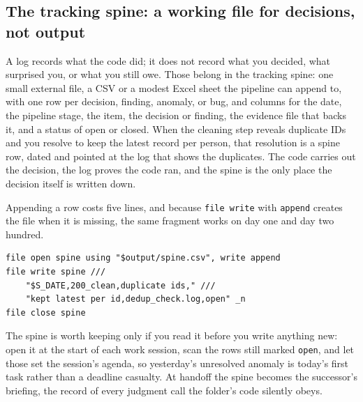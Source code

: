 \documentclass[
    a4paper,
    fontsize=10pt,
    twoside=true,
    numbers=noenddot,
]{kaobook}
\begin{document}
\subsection{The tracking spine: a working file for decisions, not output}\label{sec:ch02-spine}
A log records what the code did; it does not record what you decided, what surprised you, or what you still owe. Those belong in the tracking spine: one small external file, a CSV or a modest Excel sheet the pipeline can append to, with one row per decision, finding, anomaly, or bug, and columns for the date, the pipeline stage, the item, the decision or finding, the evidence file that backs it, and a status of open or closed. When the cleaning step reveals duplicate IDs and you resolve to keep the latest record per person, that resolution is a spine row, dated and pointed at the log that shows the duplicates. The code carries out the decision, the log proves the code ran, and the spine is the only place the decision itself is written down.

Appending a row costs five lines, and because \texttt{file write} with \texttt{append} creates the file when it is missing, the same fragment works on day one and day two hundred.
\par
{\footnotesize
\begin{verbatim}
file open spine using "$output/spine.csv", write append
file write spine ///
    "$S_DATE,200_clean,duplicate ids," ///
    "kept latest per id,dedup_check.log,open" _n
file close spine
\end{verbatim}
}
The spine is worth keeping only if you read it before you write anything new: open it at the start of each work session, scan the rows still marked \texttt{open}, and let those set the session's agenda, so yesterday's unresolved anomaly is today's first task rather than a deadline casualty. At handoff the spine becomes the successor's briefing, the record of every judgment call the folder's code silently obeys.
\end{document}
